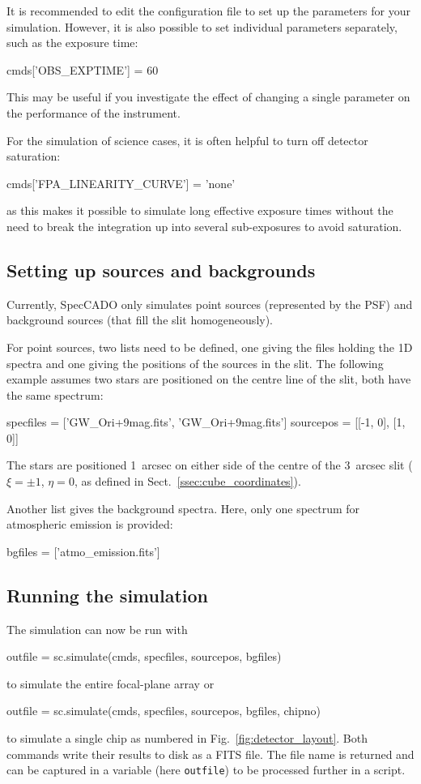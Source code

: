 \documentclass[a4paper,twoside,11pt]{article}
\begin{document}
It is recommended to edit the configuration file to set up the
parameters for your simulation. However, it is also possible to set
individual parameters separately, such as the exposure time:
\begin{pyin}
cmds['OBS_EXPTIME'] = 60
\end{pyin}
This may be useful if you investigate the effect of changing a single
parameter on the performance of the instrument.

For the simulation of science cases, it is often helpful to turn off
detector saturation:
\begin{pyin}
cmds['FPA_LINEARITY_CURVE'] = 'none'
\end{pyin}
as this makes it possible to simulate long effective exposure times
without the need to break the integration up into several
sub-exposures to avoid saturation.

\subsection{Setting up sources and backgrounds}
\label{ssec:simulation_sources}

Currently, SpecCADO only simulates point sources (represented by the
PSF) and background sources (that fill the slit homogeneously).

For point sources, two lists need to be defined, one giving the files
holding the 1D spectra and one giving the positions of the sources in
the slit. The following example assumes two stars are positioned on
the centre line of the slit, both have the same spectrum:
\begin{pyin}
specfiles = ['GW_Ori+9mag.fits', 'GW_Ori+9mag.fits']
sourcepos = [[-1, 0], [1, 0]]
\end{pyin}
The stars are positioned 1~arcsec on either side of the centre of the
3~arcsec slit ($\xi=\pm 1$, $\eta=0$, as defined in
Sect.~\ref{ssec:cube_coordinates}).

Another list gives the background spectra. Here, only one spectrum for
atmospheric emission is provided:
\begin{pyin}
bgfiles = ['atmo_emission.fits']
\end{pyin}

\subsection{Running the simulation}
\label{ssec:simulation_run}

The simulation can now be run with
\begin{pyin}
outfile = sc.simulate(cmds, specfiles, sourcepos, bgfiles)
\end{pyin}
to simulate the entire focal-plane array or
\begin{pyin}
outfile = sc.simulate(cmds, specfiles, sourcepos, bgfiles, chipno)
\end{pyin}
to simulate a single chip as numbered in
Fig.~\ref{fig:detector_layout}. Both commands write their results to
disk as a FITS file. The file name is returned and can be captured in a
variable (here \lstinline{outfile}) to be processed further in a
script.
\end{document}
